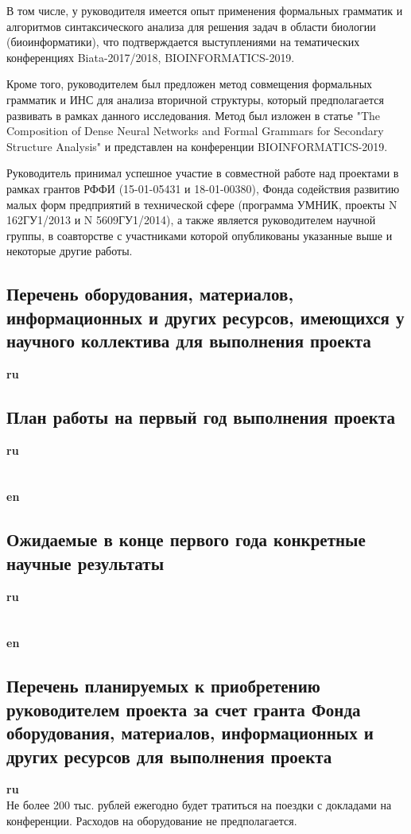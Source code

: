 \documentclass[12pt]{article}  %
\theoremstyle{remark}
\begin{document}
В том числе, у руководителя имеется опыт применения формальных грамматик и алгоритмов синтаксического анализа для решения задач в области биологии (биоинформатики), что подтверждается выступлениями на тематических конференциях Biata-2017/2018, BIOINFORMATICS-2019.

Кроме того, руководителем был предложен метод совмещения формальных грамматик и ИНС для анализа вторичной структуры, который предполагается развивать в рамках данного исследования. Метод был изложен в статье "The Composition of Dense Neural Networks and Formal Grammars for Secondary Structure Analysis" и представлен на конференции BIOINFORMATICS-2019.

Руководитель принимал успешное участие в совместной работе над проектами в рамках грантов РФФИ (15-01-05431 и 18-01-00380), Фонда содействия развитию малых форм предприятий в технической сфере
(программа УМНИК, проекты N 162ГУ1/2013 и N 5609ГУ1/2014), а также является руководителем научной группы, в соавторстве с участниками которой опубликованы указанные выше и некоторые другие работы.

\subsection{Перечень оборудования, материалов, информационных и других ресурсов, имеющихся у научного коллектива для выполнения проекта}
\textbf{ru}\\
%


\subsection{План работы на первый год выполнения проекта}

\textbf{ru}\\
%
\\
\\
\textbf{en}\\

\subsection{Ожидаемые в конце первого года конкретные научные результаты}

\textbf{ru}\\
%
\\
\\
\textbf{en}\\

\subsection{Перечень планируемых к приобретению руководителем проекта за счет гранта Фонда оборудования, материалов, информационных и других ресурсов для выполнения проекта}

\textbf{ru}\\
%
Не более 200 тыс. рублей ежегодно будет тратиться на поездки с докладами на конференции. Расходов на оборудование не предполагается.
\end{document}
